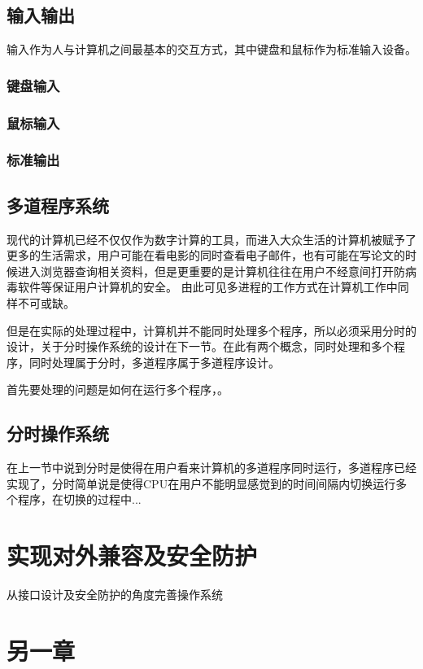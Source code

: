 \documentclass{swfcthesis}
\begin{document}
    \section{输入输出}
	
		输入作为人与计算机之间最基本的交互方式，其中键盘和鼠标作为标准输入设备。
		\subsection{键盘输入}
		\subsection{鼠标输入}
		\subsection{标准输出}
		
                
	\section{多道程序系统}
		现代的计算机已经不仅仅作为数字计算的工具，而进入大众生活的计算机被赋予了更多的生活需求，用户可能在看电影的同时查看电子邮件，也有可能在写论文的时候进入浏览器查询相关资料，但是更重要的是计算机往往在用户不经意间打开防病毒软件等保证用户计算机的安全\cite{tanenbaum2009modern}。
		由此可见多进程的工作方式在计算机工作中同样不可或缺。

		但是在实际的处理过程中，计算机并不能同时处理多个程序，所以必须采用分时的设计，关于分时操作系统的设计在下一节。在此有两个概念，同时处理和多个程序，同时处理属于分时，多道程序属于多道程序设计。

		首先要处理的问题是如何在运行多个程序，。
	\section{分时操作系统}
		在上一节中说到分时是使得在用户看来计算机的多道程序同时运行，多道程序已经实现了，分时简单说是使得CPU在用户不能明显感觉到的时间间隔内切换运行多个程序，在切换的过程中...
	
\chapter{实现对外兼容及安全防护}
从接口设计及安全防护的角度完善操作系统


\chapter{另一章}
\end{document}
